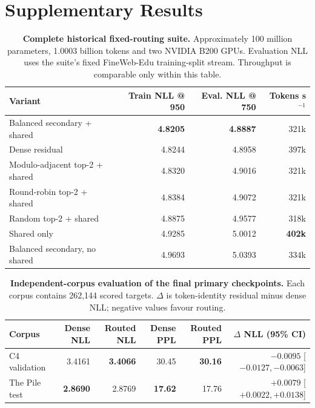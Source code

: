 \documentclass[11pt]{article}
\begin{document}
\section*{Supplementary Results}

\begin{table}[H]
\centering
\footnotesize
\setlength{\tabcolsep}{4pt}
\caption{\textbf{Complete historical fixed-routing suite.} Approximately 100 million parameters, 1.0003 billion tokens and two NVIDIA B200 GPUs. Evaluation NLL uses the suite's fixed FineWeb-Edu training-split stream. Throughput is comparable only within this table.}
\label{tab:s1}
\begin{tabular}{lrrr}
\toprule
Variant & Train NLL @ 950 & Eval. NLL @ 750 & Tokens s$^{-1}$ \\
\midrule
Balanced secondary + shared & \textbf{4.8205} & \textbf{4.8887} & 321k \\
Dense residual & 4.8244 & 4.8958 & 397k \\
Modulo-adjacent top-2 + shared & 4.8320 & 4.9016 & 321k \\
Round-robin top-2 + shared & 4.8384 & 4.9072 & 321k \\
Random top-2 + shared & 4.8875 & 4.9577 & 318k \\
Shared only & 4.9285 & 5.0012 & \textbf{402k} \\
Balanced secondary, no shared & 4.9693 & 5.0393 & 334k \\
\bottomrule
\end{tabular}
\end{table}

\begin{table}[H]
\centering
\footnotesize
\setlength{\tabcolsep}{4pt}
\caption{\textbf{Independent-corpus evaluation of the final primary checkpoints.} Each corpus contains 262,144 scored targets. $\Delta$ is token-identity residual minus dense NLL; negative values favour routing.}
\label{tab:s5}
\begin{tabular}{lrrrrr}
\toprule
Corpus & Dense NLL & Routed NLL & Dense PPL & Routed PPL & $\Delta$ NLL (95\% CI) \\
\midrule
C4 validation & 3.4161 & \textbf{3.4066} & 30.45 & \textbf{30.16} & $\mathbf{-0.0095}$ [$-0.0127,-0.0063$] \\
The Pile test & \textbf{2.8690} & 2.8769 & \textbf{17.62} & 17.76 & $+0.0079$ [$+0.0022,+0.0138$] \\
\bottomrule
\end{tabular}
\end{table}
\end{document}
